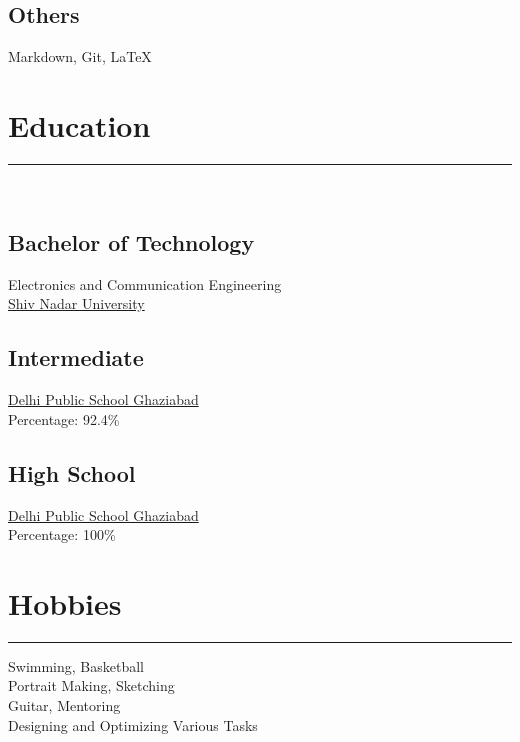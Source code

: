 \documentclass[]{rahulworld-resume}
\begin{document}
\begin{minipage}[t]{0.33\textwidth}
\vspace{6pt}
\subsection{Others}
Markdown, Git, LaTeX\\
\sectionsep

\section{Education} 
\noindent\rule{5cm}{0.4pt}\\
\subsection{Bachelor of Technology }
Electronics and Communication Engineering \\
\href{snu.edu.in}{Shiv Nadar University} \\
\vspace{8pt}
\subsection{Intermediate}
\href{https://www.dpsgs.org/ghaziabad/}{Delhi Public School Ghaziabad}\\
Percentage: 92.4\%\\
\vspace{8pt}
\subsection{High School}
\href{https://www.dpsgs.org/ghaziabad/}{Delhi Public School Ghaziabad}\\
Percentage: 100\%\\
\sectionsep


\section{Hobbies}
\noindent\rule{5cm}{0.4pt}

Swimming, Basketball \\
Portrait Making, Sketching \\
Guitar, Mentoring \\
Designing and Optimizing Various Tasks\\

\sectionsep

%
%

\end{minipage} 
\end{document}
